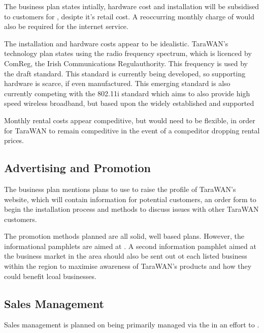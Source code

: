 \documentclass[a4paper,12pt]{article}
\newcommand{\euro}{\kern.17em{}C\kern-.95em\raise.19ex\hbox{\it=\/}\kern.17em{}}
\begin{document}
The business plan states intially, hardware cost and installation will 
be subsidised to customers for \cite[\euro 150]{busplan}, desipte it's 
\cite[\euro 250]{busplan} retail cost. A reoccurring monthly charge of 
\cite[\euro 40]{busplan} would also be required for the internet
service.


The installation and hardware costs appear to be idealistic. TaraWAN's
technology plan states using the \cite[3.5GHz]{busplan} radio frequency
spectrum, which is licenced by ComReg, the Irish Communications
Regulauthority. This frequency is used by the 
\cite[802.16 WiMax]{wimax} draft standard. This standard is
currently being developed, so supporting hardware is scarce, if even
manufactured. This emerging standard is also currently competing with
the 802.11i standard which aims to also provide high speed wireless
broadband, but based upon the widely established and supported
\cite[802.11 (aka WiFi) standard]{wifi}


Monthly rental costs appear compeditive, but would need to be flexible,
in order for TaraWAN to remain compeditive in the event of a compeditor
dropping rental prices.

\subsection{Advertising and Promotion}

The business plan mentions plans to use \cite[local radio, local
newspapers, store signs and information pamphlets]{busplan} to raise the
profile of TaraWAN's website, which will contain information for
potential customers, an order form to begin the installation process and
methods to discuss issues with other TaraWAN customers.


The promotion methods planned are all solid, well based plans. However,
the informational pamphlets are aimed at \cite[residences of potential
customers]{busplan}. A second information pamphlet aimed at the business
market in the area should also be sent out ot each listed business
within the region to maximise awareness of TaraWAN's products and how
they could benefit lcoal businesses.

\subsection{Sales Management}

Sales management is planned on being primarily managed via the
\cite[TaraWAN website]{busplan} in an effort to \cite[keep sales costs
at a minumum]{busplan}.
\end{document}

